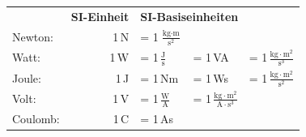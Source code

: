 \section*{}%

{
\begin{tabular}{l r l l l}
     & \textbf{SI-Einheit} & \multicolumn{3}{l}{\textbf{SI-Basiseinheiten}} \\
    Newton:  & 1\,N & = 1\,$\tfrac{\text{kg}\cdot\text{m}}{\text{s}^2}$ &         &                                                     \\
    Watt:    & 1\,W & = 1\,$\tfrac{\text{J}}{\text{s}}$                 & = 1\,VA & = 1\,$\tfrac{\text{kg}\cdot\text{m}^2}{\text{s}^3}$ \\
    Joule:   & 1\,J & = 1\,Nm                                           & = 1\,Ws & = 1\,$\tfrac{\text{kg}\cdot\text{m}^2}{\text{s}^2}$ \\
    Volt:    & 1\,V & = 1\,$\tfrac{\text{W}}{\text{A}}$                 & = 1\,$\tfrac{\text{kg}\cdot\text{m}^2}{\text{A}\cdot\text{s}^3}$ \\
    Coulomb: & 1\,C & = 1\,As                                           &         &                                                     \\
\end{tabular}}